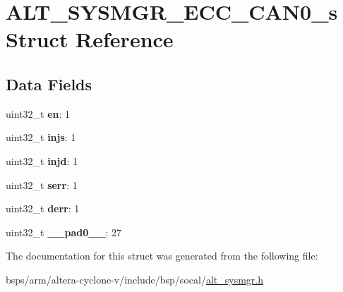\hypertarget{structALT__SYSMGR__ECC__CAN0__s}{}\section{A\+L\+T\+\_\+\+S\+Y\+S\+M\+G\+R\+\_\+\+E\+C\+C\+\_\+\+C\+A\+N0\+\_\+s Struct Reference}
\label{structALT__SYSMGR__ECC__CAN0__s}
\subsection*{Data Fields}
\begin{DoxyCompactItemize}
\item 
\mbox{\label{structALT__SYSMGR__ECC__CAN0__s_a0b0f6cf4f0903291933c36338daafd84}} 
uint32\+\_\+t {\bfseries en}\+: 1
\item 
\mbox{\label{structALT__SYSMGR__ECC__CAN0__s_a6c7a2f3c3d689d5d962b0a3f66d363ca}} 
uint32\+\_\+t {\bfseries injs}\+: 1
\item 
\mbox{\label{structALT__SYSMGR__ECC__CAN0__s_ab34071e84c8f42f30585487258bcfd14}} 
uint32\+\_\+t {\bfseries injd}\+: 1
\item 
\mbox{\label{structALT__SYSMGR__ECC__CAN0__s_ad9f3d3d6735a436ae760ffd4b7d6f83d}} 
uint32\+\_\+t {\bfseries serr}\+: 1
\item 
\mbox{\label{structALT__SYSMGR__ECC__CAN0__s_a0b4dd60f7c001a46a251392b9b4da067}} 
uint32\+\_\+t {\bfseries derr}\+: 1
\item 
\mbox{\label{structALT__SYSMGR__ECC__CAN0__s_afc373a5a08d645923349573b1e283db4}} 
uint32\+\_\+t {\bfseries \+\_\+\+\_\+pad0\+\_\+\+\_\+}\+: 27
\end{DoxyCompactItemize}


The documentation for this struct was generated from the following file\+:\begin{DoxyCompactItemize}
\item 
bsps/arm/altera-\/cyclone-\/v/include/bsp/socal/\mbox{\hyperlink{alt__sysmgr_8h}{alt\+\_\+sysmgr.\+h}}\end{DoxyCompactItemize}
